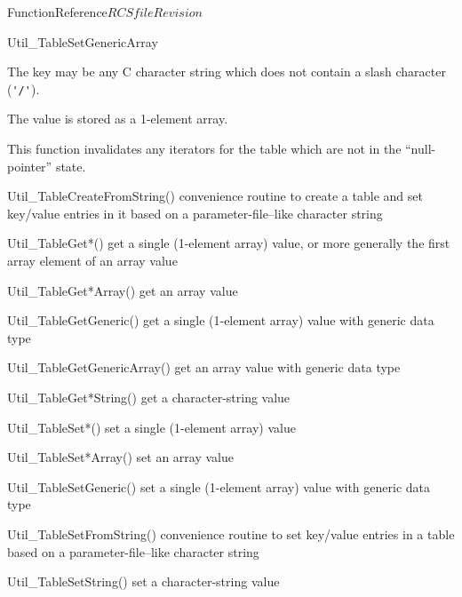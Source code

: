 \begin{cactuspart}{FunctionReference}{$RCSfile$}{$Revision$}
\begin{FunctionDescription}{Util\_TableSetGenericArray}
\begin{Discussion}
The key may be any C character string which does not contain a slash
character (\verb|'/'|).

The value is stored as a 1-element array.

This function invalidates any iterators for the table which are
not in the ``null-pointer'' state.
\end{Discussion}

\begin{SeeAlsoSection}
\begin{SeeAlso}{Util\_TableCreateFromString()}
convenience routine to create a table and set key/value entries
in it based on a parameter-file--like character string
\end{SeeAlso}
\begin{SeeAlso}{Util\_TableGet*()}
get a single (1-element array) value,
or more generally the first array element of an array value
\end{SeeAlso}
\begin{SeeAlso}{Util\_TableGet*Array()}
get an array value
\end{SeeAlso}
\begin{SeeAlso}{Util\_TableGetGeneric()}
get a single (1-element array) value with generic data type
\end{SeeAlso}
\begin{SeeAlso}{Util\_TableGetGenericArray()}
get an array value with generic data type
\end{SeeAlso}
\begin{SeeAlso}{Util\_TableGet*String()}
get a character-string value
\end{SeeAlso}
\begin{SeeAlso}{Util\_TableSet*()}
set a single (1-element array) value
\end{SeeAlso}
\begin{SeeAlso}{Util\_TableSet*Array()}
set an array value
\end{SeeAlso}
\begin{SeeAlso}{Util\_TableSetGeneric()}
set a single (1-element array) value with generic data type
\end{SeeAlso}
\begin{SeeAlso}{Util\_TableSetFromString()}
convenience routine to set key/value entries in a table based on a
parameter-file--like character string
\end{SeeAlso}
\begin{SeeAlso}{Util\_TableSetString()}
set a character-string value
\end{SeeAlso}
\end{SeeAlsoSection}


\end{FunctionDescription}
\end{cactuspart}
